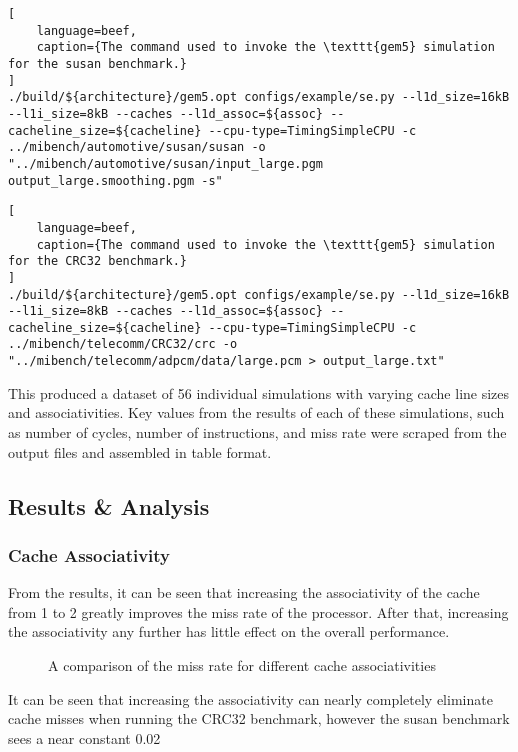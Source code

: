 \begin{lstlisting}[
    language=beef,
    caption={The command used to invoke the \texttt{gem5} simulation for the susan benchmark.}
]
./build/${architecture}/gem5.opt configs/example/se.py --l1d_size=16kB --l1i_size=8kB --caches --l1d_assoc=${assoc} --cacheline_size=${cacheline} --cpu-type=TimingSimpleCPU -c ../mibench/automotive/susan/susan -o "../mibench/automotive/susan/input_large.pgm output_large.smoothing.pgm -s"
\end{lstlisting}

\begin{lstlisting}[
    language=beef,
    caption={The command used to invoke the \texttt{gem5} simulation for the CRC32 benchmark.}
]
./build/${architecture}/gem5.opt configs/example/se.py --l1d_size=16kB --l1i_size=8kB --caches --l1d_assoc=${assoc} --cacheline_size=${cacheline} --cpu-type=TimingSimpleCPU -c ../mibench/telecomm/CRC32/crc -o "../mibench/telecomm/adpcm/data/large.pcm > output_large.txt"
\end{lstlisting}

This produced a dataset of 56 individual simulations with varying cache line sizes and 
associativities.
Key values from the results of each of these simulations, such as number of cycles, 
number of instructions, and miss rate were scraped from the output files and assembled 
in table format.

\subsection{Results \& Analysis}

\subsubsection{Cache Associativity}

From the results, it can be seen that increasing the associativity of the cache from 
1 to 2 greatly improves the miss rate of the processor. After that, increasing the 
associativity any further has little effect on the overall performance.

\begin{figure}[H]
    \centering
    
    \caption{A comparison of the miss rate for different cache associativities}
    \label{fig:partb-assoc}
\end{figure}

It can be seen that increasing the associativity can nearly completely eliminate 
cache misses when running the CRC32 benchmark, however the susan benchmark sees a near 
constant 0.02%

